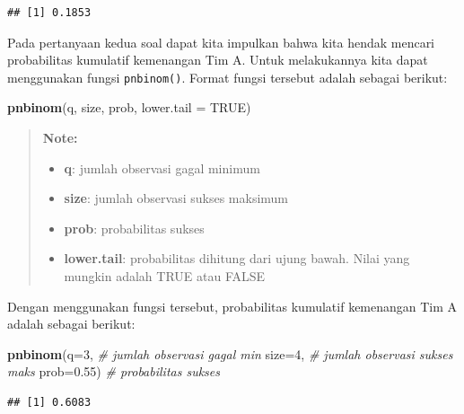 \documentclass[]{book}
\newenvironment{Shaded}{\begin{snugshade}}{\end{snugshade}}
\newcommand{\KeywordTok}[1]{\textcolor[rgb]{0.13,0.29,0.53}{\textbf{#1}}}
\newcommand{\DataTypeTok}[1]{\textcolor[rgb]{0.13,0.29,0.53}{#1}}
\newcommand{\DecValTok}[1]{\textcolor[rgb]{0.00,0.00,0.81}{#1}}
\newcommand{\FloatTok}[1]{\textcolor[rgb]{0.00,0.00,0.81}{#1}}
\newcommand{\CommentTok}[1]{\textcolor[rgb]{0.56,0.35,0.01}{\textit{#1}}}
\newcommand{\OtherTok}[1]{\textcolor[rgb]{0.56,0.35,0.01}{#1}}
\newcommand{\NormalTok}[1]{#1}
\providecommand{\tightlist}{%
  \setlength{\itemsep}{0pt}\setlength{\parskip}{0pt}}
\begin{document}
\begin{verbatim}
## [1] 0.1853
\end{verbatim}

Pada pertanyaan kedua soal dapat kita impulkan bahwa kita hendak mencari
probabilitas kumulatif kemenangan Tim A. Untuk melakukannya kita dapat
menggunakan fungsi \texttt{pnbinom()}. Format fungsi tersebut adalah
sebagai berikut:

\begin{Shaded}
\begin{Highlighting}[]
\KeywordTok{pnbinom}\NormalTok{(q, size, prob, }\DataTypeTok{lower.tail =} \OtherTok{TRUE}\NormalTok{)}
\end{Highlighting}
\end{Shaded}

\begin{quote}
\textbf{Note: }

\begin{itemize}
\tightlist
\item
  \textbf{q}: jumlah observasi gagal minimum
\item
  \textbf{size}: jumlah observasi sukses maksimum
\item
  \textbf{prob}: probabilitas sukses
\item
  \textbf{lower.tail}: probabilitas dihitung dari ujung bawah. Nilai
  yang mungkin adalah TRUE atau FALSE
\end{itemize}
\end{quote}

Dengan menggunakan fungsi tersebut, probabilitas kumulatif kemenangan
Tim A adalah sebagai berikut:

\begin{Shaded}
\begin{Highlighting}[]
\KeywordTok{pnbinom}\NormalTok{(}\DataTypeTok{q=}\DecValTok{3}\NormalTok{, }\CommentTok{# jumlah observasi gagal min}
        \DataTypeTok{size=}\DecValTok{4}\NormalTok{, }\CommentTok{# jumlah observasi sukses maks}
        \DataTypeTok{prob=}\FloatTok{0.55}\NormalTok{) }\CommentTok{# probabilitas sukses}
\end{Highlighting}
\end{Shaded}

\begin{verbatim}
## [1] 0.6083
\end{verbatim}
\end{document}
